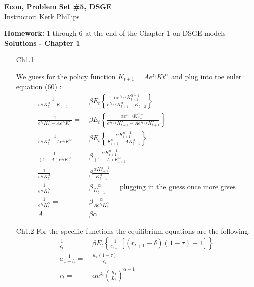 \documentclass[letterpaper,12pt]{article}
\theoremstyle{definition}
\begin{document}
\begin{flushleft}
   \textbf{\large{Econ, Problem Set \#5, DSGE}} \\[5pt] Instructor: Kerk Phillips \\[5pt]
\end{flushleft}
\textbf{Homework:} 1 through 6 at the end of the Chapter 1 on DSGE models \\

\textbf{Solutions - Chapter 1}
\begin{enumerate}
\item[Ch1.1] 

We guess for the policy function $K_{t+1} = Ae^{z_t}Kt^{\alpha}$ and plug into toe euler equation (60) :
\begin{align*}
\frac{1}{e^{z_t}K_t^{\alpha} - K_{t+1}} =&\,  \beta E_t \left\lbrace \frac{\alpha e^{z_{t+1}}K_{t+1}^{\alpha -1}}{e^{z_{t+1}}K_{t+1}^{\alpha} - K_{t+2}} 
\right\rbrace\\
\frac{1}{e^{z_t}K_t^{\alpha} - Ae^{z_t}K^{\alpha}} =&\,  \beta E_t \left\lbrace \frac{\alpha e^{z_{t+1}}K_{t+1}^{\alpha -1}}{e^{z_{t+1}}K_{t+1}^{\alpha} - Ae^{z_{t+1}}K_{t+1}^{\alpha}} \right\rbrace\\
\frac{1}{e^{z_t}K_t^{\alpha} - Ae^{z_t}K^{\alpha}} =&\,  \beta E_t \left\lbrace \frac{\alpha K_{t+1}^{\alpha -1}}{K_{t+1}^{\alpha} - AK_{t+1}^{\alpha}} \right\rbrace\\
\frac{1}{(1 - A)e^{z_t}K_t^{\alpha}} =&\,  \beta  \frac{\alpha K_{t+1}^{\alpha -1}}{(1 - A)K_{t+1}^{\alpha}}\\
\frac{1}{e^{z_t}K_t^{\alpha}} =&\,  \beta  \frac{\alpha K_{t+1}^{\alpha -1}}{K_{t+1}^{\alpha}}\\
\frac{1}{e^{z_t}K_t^{\alpha}} =&\,  \beta  \frac{\alpha}{K_{t+1}} 
\qquad \text{plugging in the guess once more gives}\\
\frac{1}{e^{z_t}K_t^{\alpha}} =&\,  \beta  \frac{\alpha}{Ae^{z_t}K_t^{\alpha}} \\
A=&\, \beta \alpha
\end{align*}
\item[Ch1.2]
For the specific functions the equilibrium equations are the following:
\begin{align*}
\frac{1}{c_t} = &\, \beta E_t \left\lbrace \frac{1}{c_{t+1}}[(r_{t+1} - \delta)(1-\tau)+1] \right\rbrace \\
a \frac{1}{1-l_t} = &\, \frac{w_t(1-\tau)}{c_t}\\
r_t=&\,\alpha e^{z_t} \left( \frac{K_t}{L_t} \right)^{\alpha-1}\\

\end{align*}
\end{enumerate}
\end{document}
